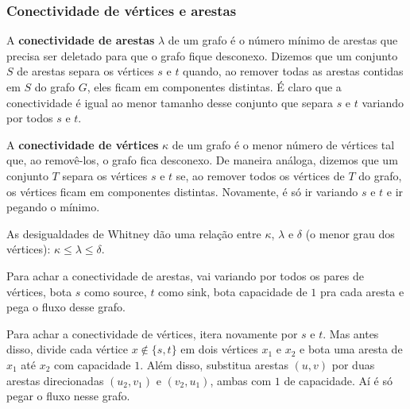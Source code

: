 \subsubsection{Conectividade de vértices e arestas}

A \textbf{conectividade de arestas} $\lambda$ de um grafo é o número mínimo de arestas que precisa 
ser deletado para que o grafo fique desconexo. Dizemos que um conjunto $S$
de arestas separa os vértices $s$ e $t$ quando, ao remover todas as arestas contidas em $S$
do grafo $G$, eles ficam em componentes distintas. 
É claro que a conectividade é igual ao menor tamanho desse conjunto que separa $s$ e $t$ 
variando por todos $s$ e $t$.

A \textbf{conectividade de vértices} $\kappa$ de um grafo é o menor número de vértices tal que, ao
removê-los, o grafo fica desconexo. De maneira análoga, dizemos que um conjunto $T$ separa
os vértices $s$ e $t$ se, ao remover todos os vértices de $T$ do grafo, os vértices ficam
em componentes distintas. Novamente, é só ir variando $s$ e $t$ e ir pegando o mínimo.

As desigualdades de Whitney dão uma relação entre $\kappa$, $\lambda$ e $\delta$ (o menor grau
dos vértices): $\kappa \leq \lambda \leq \delta$.

Para achar a conectividade de arestas, vai variando por todos os pares de vértices, bota $s$
como source, $t$ como sink, bota capacidade de $1$ pra cada aresta e pega o fluxo desse grafo.

Para achar a conectividade de vértices, itera novamente por $s$ e $t$. Mas antes disso, divide
cada vértice $x \not\in \{s, t\}$ em dois vértices $x_1$ e $x_2$ e bota uma aresta de $x_1$
até $x_2$ com capacidade $1$. Além disso, substitua arestas $(u, v)$ por duas arestas direcionadas
$(u_2, v_1)$ e $(v_2, u_1)$, ambas com $1$ de capacidade. Aí é só pegar o fluxo nesse grafo.